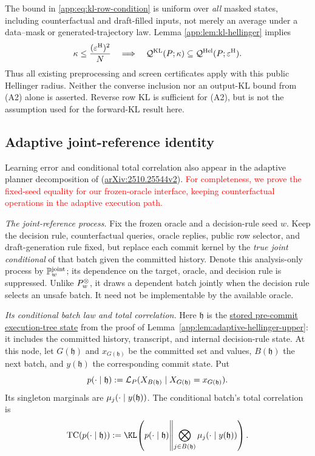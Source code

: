 The bound in \eqref{app:eq:kl-row-condition} is uniform over \emph{all} masked
states, including counterfactual and draft-filled inputs, not merely an
average under a data--mask or generated-trajectory law.  Lemma
\ref{app:lem:kl-hellinger} implies
\begin{equation}
 \KLRowBudget\le\frac{(\OracleRadius)^2}{N}
 \quad\Longrightarrow\quad
 \KLOracleClass(\TargetLaw;\KLRowBudget)
 \subseteq\OracleClass(\TargetLaw;\OracleRadius).
 \label{app:eq:kl-oracle-inclusion}
\end{equation}
Thus all existing preprocessing and screen certificates apply with this
public Hellinger radius.  Neither the converse inclusion nor an output-KL
bound from (A2) alone is asserted.  Reverse row KL is sufficient for (A2),
but is not the assumption used for the forward-KL result here.

\subsection{Adaptive joint-reference identity}
\label{app:kl-joint-reference}

Learning error and conditional total correlation also appear in the adaptive
planner decomposition of \citet[Proposition~2]{lavenant2025error}
(\href{https://arxiv.org/html/2510.25544v2}{arXiv:2510.25544v2}).
\textcolor{red}{For completeness, we prove the fixed-seed equality for our
frozen-oracle interface, keeping counterfactual operations in the adaptive
execution path.}


\emph{The joint-reference process.}
Fix the frozen oracle and a decision-rule seed $w$.  Keep the decision rule,
counterfactual queries, oracle replies, public row selector, and draft-generation rule fixed, but
replace each commit kernel by the \emph{true joint conditional} of that
batch given the committed history.  Denote this analysis-only process by
$\JointReferenceLaw{w}$; its dependence on the target, oracle, and decision rule
is suppressed.  Unlike $\ExactCommitOutputLaw{w}$, it draws a dependent
batch jointly when the decision rule selects an unsafe batch.  It need not be
implementable by the available oracle.


\emph{Its conditional batch law and total correlation.}
Here $\mathfrak h$ is the
\hyperlink{app-execution-tree-state}{stored pre-commit execution-tree state}
from the proof of Lemma~\ref{app:lem:adaptive-hellinger-upper}: it includes
the committed history, transcript, and internal decision-rule state.
At this node, let $G(\mathfrak h)$ and
$x_{G(\mathfrak h)}$ be the committed set and values, $B(\mathfrak h)$
the next batch, and $y(\mathfrak h)$ the corresponding commit state.  Put
\[
 \JointBatchLaw{\mathfrak h}
 :=\mathcal L_{\TargetLaw}
   (X_{B(\mathfrak h)}\mid
    X_{G(\mathfrak h)}=x_{G(\mathfrak h)}).
\]
Its singleton marginals are $\ExactRow{y(\mathfrak h)}{j}$.
The conditional batch's total correlation is
\[
 \mathrm{TC}(\JointBatchLaw{\mathfrak h})
 :=\KLDivergence{\JointBatchLaw{\mathfrak h}}
  {\bigotimes_{j\in B(\mathfrak h)}\ExactRow{y(\mathfrak h)}{j}}.
\]

